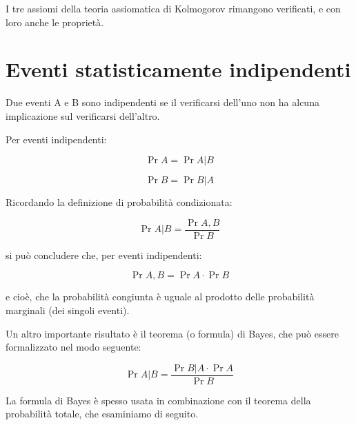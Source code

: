I tre assiomi della teoria assiomatica di Kolmogorov rimangono verificati, e con loro anche le proprietà. \newline 

\newpage 

\section{Eventi statisticamente indipendenti} 

Due eventi A e B sono indipendenti se il verificarsi dell'uno non ha alcuna implicazione sul verificarsi dell'altro. \newline 

Per eventi indipendenti: 

{
    \Large 
    \begin{equation}
        \Pr{A} = \Pr{A | B}
    \end{equation}
}

{
    \Large 
    \begin{equation}
        \Pr{B} = \Pr{B | A}
    \end{equation}
}

Ricordando la definizione di probabilità condizionata: 

{
    \Large 
    \begin{equation}
        \Pr{A | B} = \frac{\Pr{A, B}}{\Pr{B}}
    \end{equation}
} 

si può concludere che, per eventi indipendenti: 

{   
    \Large 
    \begin{equation}
        \Pr{A, B} = \Pr{A} \cdot \Pr{B}   
    \end{equation}
}

e cioè, che la probabilità congiunta è uguale al prodotto delle probabilità marginali (dei singoli eventi). \newline 

Un altro importante risultato è il teorema (o formula) di Bayes, che può essere formalizzato nel modo seguente: 

{
    \Large 
    \begin{equation}
        \Pr{A | B} = \frac{\Pr{B | A} \cdot \Pr{A}}{\Pr{B}}
    \end{equation}
} 

La formula di Bayes è spesso usata in combinazione con il teorema della probabilità totale, 
che esaminiamo di seguito. \newline 

